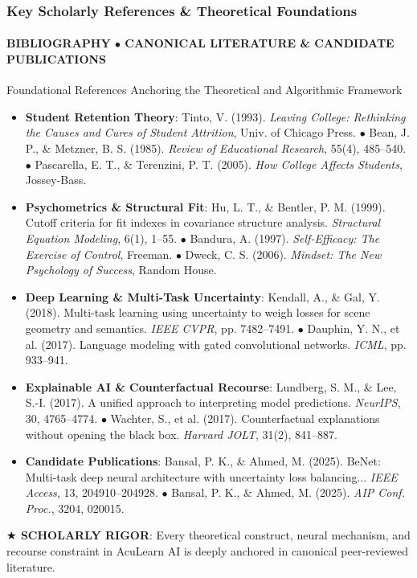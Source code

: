 \documentclass[aspectratio=169, 10pt]{beamer}
\newcommand{\leadbullet}[2]{\textbf{\color{NavyDark}#1}: \color{TextBody}#2}
\begin{document}
\begin{frame}
  \frametitle{Key Scholarly References \& Theoretical Foundations}
  \framesubtitle{BIBLIOGRAPHY $\bullet$ CANONICAL LITERATURE \& CANDIDATE PUBLICATIONS}

  \begin{defensecard}{Foundational References Anchoring the Theoretical and Algorithmic Framework}
    \begin{itemize}\setlength{\itemsep}{2pt}\setlength{\parskip}{0pt}\fontsize{7.2pt}{9.0pt}\selectfont
      \item \leadbullet{Student Retention Theory}{Tinto, V. (1993). \textit{Leaving College: Rethinking the Causes and Cures of Student Attrition}, Univ. of Chicago Press. $\bullet$ Bean, J. P., \& Metzner, B. S. (1985). \textit{Review of Educational Research}, 55(4), 485--540. $\bullet$ Pascarella, E. T., \& Terenzini, P. T. (2005). \textit{How College Affects Students}, Jossey-Bass.}
      \item \leadbullet{Psychometrics \& Structural Fit}{Hu, L. T., \& Bentler, P. M. (1999). Cutoff criteria for fit indexes in covariance structure analysis. \textit{Structural Equation Modeling}, 6(1), 1--55. $\bullet$ Bandura, A. (1997). \textit{Self-Efficacy: The Exercise of Control}, Freeman. $\bullet$ Dweck, C. S. (2006). \textit{Mindset: The New Psychology of Success}, Random House.}
      \item \leadbullet{Deep Learning \& Multi-Task Uncertainty}{Kendall, A., \& Gal, Y. (2018). Multi-task learning using uncertainty to weigh losses for scene geometry and semantics. \textit{IEEE CVPR}, pp. 7482--7491. $\bullet$ Dauphin, Y. N., et al. (2017). Language modeling with gated convolutional networks. \textit{ICML}, pp. 933--941.}
      \item \leadbullet{Explainable AI \& Counterfactual Recourse}{Lundberg, S. M., \& Lee, S.-I. (2017). A unified approach to interpreting model predictions. \textit{NeurIPS}, 30, 4765--4774. $\bullet$ Wachter, S., et al. (2017). Counterfactual explanations without opening the black box. \textit{Harvard JOLT}, 31(2), 841--887.}
      \item \leadbullet{Candidate Publications}{Bansal, P. K., \& Ahmed, M. (2025). BeNet: Multi-task deep neural architecture with uncertainty loss balancing... \textit{IEEE Access}, 13, 204910--204928. $\bullet$ Bansal, P. K., \& Ahmed, M. (2025). \textit{AIP Conf. Proc.}, 3204, 020015.}
    \end{itemize}
  \end{defensecard}
  \vspace{-0.1cm}

  \begin{takeawaybanner}
    \textbf{\color{GoldPill}$\bigstar$ SCHOLARLY RIGOR}: Every theoretical construct, neural mechanism, and recourse constraint in AcuLearn AI is deeply anchored in canonical peer-reviewed literature.
  \end{takeawaybanner}
\end{frame}
\end{document}
